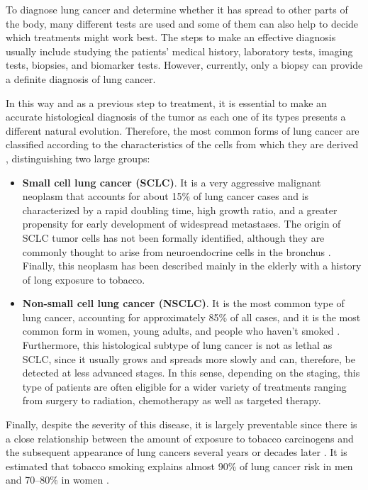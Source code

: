 To diagnose lung cancer and determine whether it has spread to other parts of the body, many different tests are used and some of them can also help to decide which treatments might work best. The steps to make an effective diagnosis usually include studying the patients' medical history, laboratory tests, imaging tests, biopsies, and biomarker tests. However, currently, only a biopsy can provide a definite diagnosis of lung cancer.

In this way and as a previous step to treatment, it is essential to make an accurate histological diagnosis of the tumor as each one of its types presents a different natural evolution. Therefore, the most common forms of lung cancer are classified according to the characteristics of the cells from which they are derived \cite{WHO}, distinguishing two large groups:
\begin{itemize}
    \item \textbf{Small cell lung cancer (SCLC)}. It is a very aggressive malignant neoplasm that accounts for about 15\% of lung cancer cases \cite{SCLC} and is characterized by a rapid doubling time, high growth ratio, and a greater propensity for early development of widespread metastases. The origin of SCLC tumor cells has not been formally identified, although they are commonly thought to arise from neuroendocrine cells in the bronchus \cite{SCLC_cell_orig}. Finally, this neoplasm has been described mainly in the elderly with a history of long exposure to tobacco.
    \item \textbf{Non-small cell lung cancer (NSCLC)}. It is the most common type of lung cancer, accounting for approximately 85\% of all cases, and it is the most common form in women, young adults, and people who haven't smoked \cite{NSCLC}. Furthermore, this histological subtype of lung cancer is not as lethal as SCLC, since it usually grows and spreads more slowly and can, therefore, be detected at less advanced stages. In this sense, depending on the staging, this type of patients are often eligible for a wider variety of treatments ranging from surgery to radiation, chemotherapy as well as targeted therapy.
\end{itemize}

Finally, despite the severity of this disease, it is largely preventable since there is a close relationship between the amount of exposure to tobacco carcinogens and the subsequent appearance of lung cancers several years or decades later \cite{Tobacco}. It is estimated that tobacco smoking explains almost 90\% of lung cancer risk in men and 70–80\% in women \cite{Smoking}.

